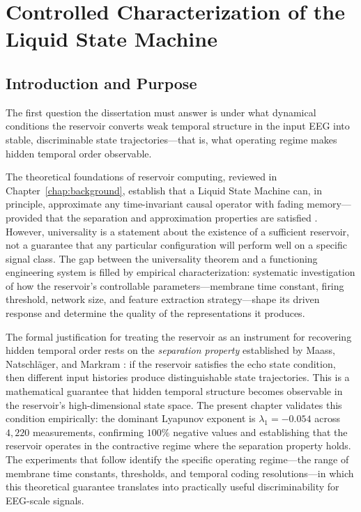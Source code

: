 \chapter{Controlled Characterization of the Liquid State Machine}
\label{chap:lsm}

\section{Introduction and Purpose}
\label{sec:ch3_intro}

The first question the dissertation must answer is under what dynamical conditions the reservoir converts weak temporal structure in the input EEG into stable, discriminable state trajectories---that is, what operating regime makes hidden temporal order observable.

The theoretical foundations of reservoir computing, reviewed in Chapter~\ref{chap:background}, establish that a Liquid State Machine can, in principle, approximate any time-invariant causal operator with fading memory---provided that the separation and approximation properties are satisfied \cite{Maass2002RealTime, boyd_chua_1985}. However, universality is a statement about the existence of a sufficient reservoir, not a guarantee that any particular configuration will perform well on a specific signal class. The gap between the universality theorem and a functioning engineering system is filled by empirical characterization: systematic investigation of how the reservoir's controllable parameters---membrane time constant, firing threshold, network size, and feature extraction strategy---shape its driven response and determine the quality of the representations it produces.

The formal justification for treating the reservoir as an instrument for recovering hidden temporal order rests on the \emph{separation property} established by Maass, Natschl\"{a}ger, and Markram \cite{Maass2002RealTime}: if the reservoir satisfies the echo state condition, then different input histories produce distinguishable state trajectories. This is a mathematical guarantee that hidden temporal structure becomes observable in the reservoir's high-dimensional state space. The present chapter validates this condition empirically: the dominant Lyapunov exponent is $\lambda_1 = -0.054$ across $4{,}220$ measurements, confirming $100\%$ negative values and establishing that the reservoir operates in the contractive regime where the separation property holds. The experiments that follow identify the specific operating regime---the range of membrane time constants, thresholds, and temporal coding resolutions---in which this theoretical guarantee translates into practically useful discriminability for EEG-scale signals.

